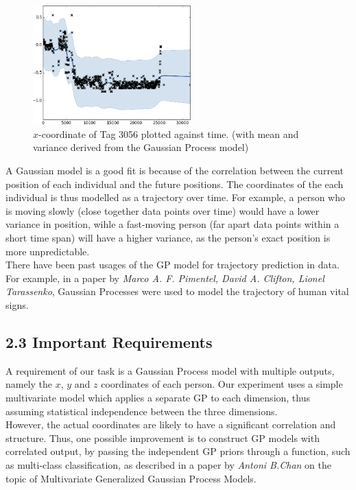 \documentclass[letterpaper]{article}
\begin{document}
\begin{figure}[!h]
  \centering
    \includegraphics[width=230px,natwidth=665,natheight=391]{selected_GP/3056.csv_X.png}
  \caption{$x$-coordinate of Tag 3056 plotted against time. (with mean and variance derived from the Gaussian Process model)}
  \label{fig:GP1}
\end{figure}

A Gaussian model is a good fit is because of the correlation between the current position of each individual and the future positions. The coordinates of the each individual is thus modelled as a trajectory over time. For example, a person who is moving slowly (close together data points over time) would have a lower variance in position, wihle a fast-moving person (far apart data points within a short time span) will have a higher variance, as the person's exact position is more unpredictable. \\

There have been past usages of the GP model for trajectory prediction in data. For example, in a paper by {\it Marco A. F. Pimentel, David A. Clifton, Lionel Tarassenko}, Gaussian Processes were used to model the trajectory of human vital signs.

\subsection{2.3  Important Requirements}

A requirement of our task is a Gaussian Process model with multiple outputs, namely the $x$, $y$ and $z$ coordinates of each person. Our experiment uses a simple multivariate model which applies a separate GP to each dimension, thus assuming statistical independence between the three dimensions. \\

However, the actual coordinates are likely to have a significant correlation and structure. Thus, one possible improvement is to construct GP models with correlated output, by passing the independent GP priors through a function, such as multi-class classification, as described in a paper by {\it Antoni B.Chan} on the topic of Multivariate Generalized Gaussian Process Models. \\
\end{document}
